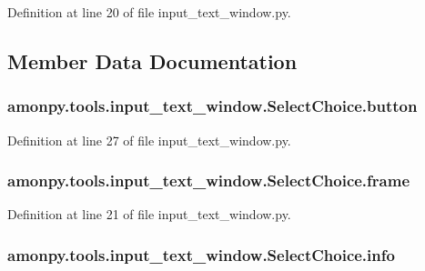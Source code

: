 Definition at line 20 of file input\-\_\-text\-\_\-window.\-py.



\subsection{Member Data Documentation}
\hypertarget{classamonpy_1_1tools_1_1input__text__window_1_1_select_choice_acc99d030bfd068e7f24d6d77f5c5c767}{
\subsubsection[{button}]{\setlength{\rightskip}{0pt plus 5cm}amonpy.\-tools.\-input\-\_\-text\-\_\-window.\-Select\-Choice.\-button}}\label{classamonpy_1_1tools_1_1input__text__window_1_1_select_choice_acc99d030bfd068e7f24d6d77f5c5c767}


Definition at line 27 of file input\-\_\-text\-\_\-window.\-py.

\hypertarget{classamonpy_1_1tools_1_1input__text__window_1_1_select_choice_aee9b6e27856594efa52216a82b62521e}{
\subsubsection[{frame}]{\setlength{\rightskip}{0pt plus 5cm}amonpy.\-tools.\-input\-\_\-text\-\_\-window.\-Select\-Choice.\-frame}}\label{classamonpy_1_1tools_1_1input__text__window_1_1_select_choice_aee9b6e27856594efa52216a82b62521e}


Definition at line 21 of file input\-\_\-text\-\_\-window.\-py.

\hypertarget{classamonpy_1_1tools_1_1input__text__window_1_1_select_choice_aa47ee685de6c28e23b244fdae0eaad87}{
\subsubsection[{info}]{\setlength{\rightskip}{0pt plus 5cm}amonpy.\-tools.\-input\-\_\-text\-\_\-window.\-Select\-Choice.\-info}}\label{classamonpy_1_1tools_1_1input__text__window_1_1_select_choice_aa47ee685de6c28e23b244fdae0eaad87}


